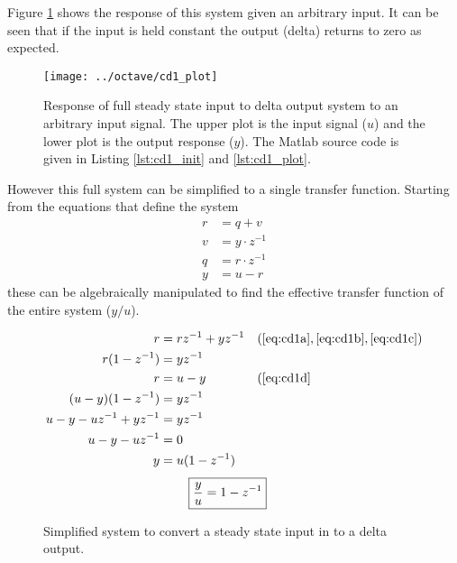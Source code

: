 \documentclass{article}
\begin{document}

Figure \ref{fig:cd1_plot} shows the response of this system given
an arbitrary input.
It can be seen that if the input is held constant the output (delta)
returns to zero as expected.

\begin{figure}[htbp!]
\texttt{[image: ../octave/cd1\_plot]}
\caption{Response of full steady state input to delta output system
to an arbitrary input signal.
The upper plot is the input signal ($u$) and the lower plot is
the output response ($y$).
The Matlab source code is given in Listing \ref{lst:cd1_init}
and \ref{lst:cd1_plot}.
}
\label{fig:cd1_plot}
\end{figure}

\begin{samepage}
However this full system can be simplified to a single transfer function.
Starting from the equations that define the system
\begin{align}
	r &= q + v \label{eq:cd1a} \\
	v &= y \cdot z^{-1} \label{eq:cd1b} \\
	q &= r \cdot z^{-1} \label{eq:cd1c} \\
	y &= u - r \label{eq:cd1d}
\end{align}
these can be algebraically manipulated to find the effective transfer
function of the entire system ($y/u$).
\end{samepage}

\begin{align*}
	r &= r z^{-1} + y z^{-1} && (\ref{eq:cd1a}, \ref{eq:cd1b}, \ref{eq:cd1c})\\
	r(1 - z^{-1}) &= y z^{-1} \\
	r &= u - y && (\ref{eq:cd1d} \\
	(u - y)(1 - z^{-1}) &= y z^{-1} \\
	u - y - u z^{-1} + y z^{-1} &= y z^{-1} \\
	u - y - u z^{-1} &= 0 \\
	y &= u (1 - z^{-1})
\end{align*}
\begin{align}
	\Aboxed{ \frac{y}{u} &= 1 - z^{-1} }
\end{align}

\begin{figure}[!htbp]
\begin{center}


\end{center}
\caption{Simplified system to convert a steady state input in to
a delta output.}
\label{fig:cd1s}
\end{figure}
\end{document}
